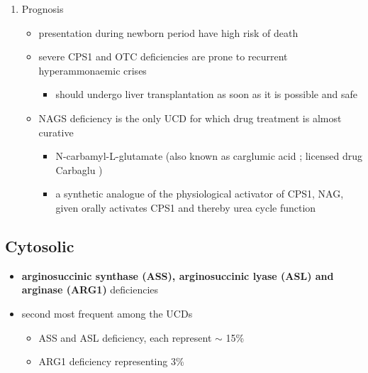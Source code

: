 \documentclass{scrartcl}
\begin{document}
\begin{enumerate}
\item Prognosis
\label{sec:orgc719f7e}
\begin{itemize}
\item presentation during newborn period have high risk of death
\item severe CPS1 and OTC deficiencies are prone to recurrent
hyperammonaemic crises
\begin{itemize}
\item should undergo liver transplantation as soon as it is possible and
safe
\end{itemize}
\item NAGS deficiency is the only UCD for which drug treatment is almost
curative
\begin{itemize}
\item N-carbamyl-L-glutamate (also known as carglumic acid ; licensed
drug Carbaglu )
\item a synthetic analogue of the physiological activator of CPS1, NAG,
given orally activates CPS1 and thereby urea cycle function
\end{itemize}
\end{itemize}
\end{enumerate}

\subsection{Cytosolic}
\label{sec:org493a315}
\begin{itemize}
\item \textbf{arginosuccinic synthase (ASS), arginosuccinic lyase (ASL) and arginase (ARG1)} deficiencies
\item second most frequent among the UCDs
\begin{itemize}
\item ASS and ASL deficiency, each represent \(\sim\) 15\%
\item ARG1 deficiency representing 3\%
\end{itemize}
\end{itemize}
\end{document}
